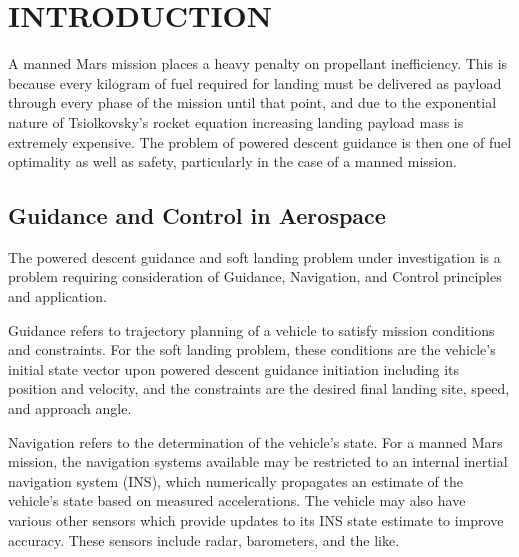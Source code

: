 %

\chapter{INTRODUCTION}
\label{chap:intro}
A manned Mars mission places a heavy penalty on propellant inefficiency. This is because every kilogram of fuel required for landing must be delivered as payload through every phase of the mission until that point, and due to the exponential nature of Tsiolkovsky's rocket equation increasing landing payload mass is extremely expensive. The problem of powered descent guidance is then one of fuel optimality as well as safety, particularly in the case of a manned mission. 


\section{Guidance and Control in Aerospace} \label{sec:guidancevcontrol}
The powered descent guidance and soft landing problem under investigation is a problem requiring consideration of Guidance, Navigation, and Control principles and application. 

Guidance refers to trajectory planning of a vehicle to satisfy mission conditions and constraints. For the soft landing problem, these conditions are the vehicle's initial state vector upon powered descent guidance initiation including its position and velocity, and the constraints are the desired final landing site, speed, and approach angle.

Navigation refers to the determination of the vehicle's state. For a manned Mars mission, the navigation systems available may be restricted to an internal inertial navigation system (INS), which numerically propagates an estimate of the vehicle's state based on measured accelerations. The vehicle may also have various other sensors which provide updates to its INS state estimate to improve accuracy. These sensors include radar, barometers, and the like.


